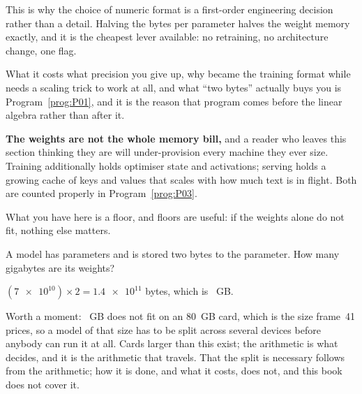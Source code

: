 \begin{fr}
\begin{aibox}
This is why the choice of numeric format is a first-order engineering decision
rather than a detail. Halving the bytes per parameter halves the weight memory
exactly, and it is the cheapest lever available: no retraining, no architecture
change, one flag.

What it costs \dash{} what precision you give up, why  became the
training format while  needs a scaling trick to work at all, and
what \enquote{two bytes} actually buys you \dash{} is
Program~\ref{prog:P01}, and it is the reason that program comes before the
linear algebra rather than after it.
\end{aibox}

\begin{warning}
\textbf{The weights are not the whole memory bill,} and a reader who leaves
this section thinking they are will under-provision every machine they ever
size. Training additionally holds optimiser state and activations; serving
holds a growing cache of keys and values that scales with how much text is in
flight. Both are counted properly in Program~\ref{prog:P03}.

What you have here is a floor, and floors are useful: if the weights alone do
not fit, nothing else matters.
\end{warning}

\yourturn
A model has  parameters and is stored two bytes to the
parameter. How many gigabytes are its weights?
\dotline
\nextframe
\end{fr}

\begin{fr}
\begin{ansblock}
$(\num{7e10}) \times 2 = \num{1.4e11}$ bytes, which is ~GB.
\end{ansblock}

Worth a moment: ~GB does not fit on an $80$~GB card, which is
the size frame~41 prices, so a model of that size has to be split across
several devices before anybody can run it at all. Cards larger than this
exist; the arithmetic is what decides, and it is the arithmetic that
travels. That the split is
necessary follows from the arithmetic; how it is done, and what it costs, does
not, and this book does not cover it.
\end{fr}

